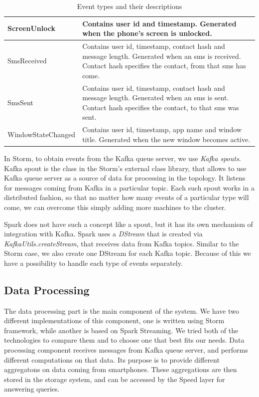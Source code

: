 \begin{table}[h]
\begin{tabular}{ | l | p{10cm} |}
    ScreenUnlock & Contains user id and timestamp. Generated when the phone's screen is unlocked. \\ \hline
    SmsReceived & Contains user id,  timestamp, contact hash and message length. Generated when an sms is received. Contact hash specifies the contact, from that sms has come. \\ \hline
    SmsSent & Contains user id,  timestamp, contact hash and message length. Generated when an sms is sent. Contact hash specifies the contact, to that sms was sent. \\ \hline
    WindowStateChanged & Contains user id, timestamp, app name and window title. Generated when the new window becomes active. \\
    \hline
\end{tabular}
\caption{Event types and their descriptions}
\label{table:event_types}
\end{table}

In Storm, to obtain events from the Kafka queue server, we use \textit{Kafka spouts}.
Kafka spout is the class in the Storm's external class library, that allows to use Kafka queue server as a source of data for processing in the topology.
It listens for messages coming from Kafka in a particular topic.
Each such spout works in a distributed fashion, so that no matter how many events of a particular type will come, we can overcome this simply adding more machines to the cluster.

Spark does not have such a concept like a spout, but it has its own mechanism of integration with Kafka.
Spark uses a \textit{DStream} that is created via \textit{KafkaUtils.createStream}, that receives data from Kafka topics.
Similar to the Storm case, we also create one DStream for each Kafka topic.
Because of this we have a possibility to handle each type of events separately.

\subsection{Data Processing}

The data processing part is the main component of the system.
We have two different implementations of this component, one is written using Storm framework, while another is based on Spark Streaming.
We tried both of the technologies to compare them and to choose one that best fits our needs.
Data processing component receives messages from Kafka queue server, and performs different computations on that data.
Its purpose is to provide different aggregatons on data coming from smartphones.
These aggregations are then stored in the storage system, and can be accessed by the Speed layer for answering queries.

